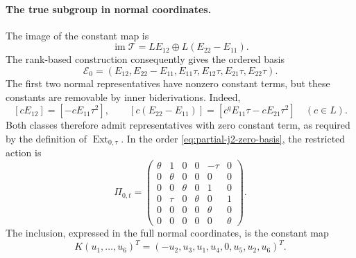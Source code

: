 \paragraph{The true subgroup in normal coordinates.}
The image of the constant map is
\[
 \operatorname{im}\mathcal T
 =L E_{12}\oplus L(E_{22}-E_{11}).
\]
The rank-based construction consequently gives the ordered basis
\begin{equation}
 \mathcal E_0=(E_{12},E_{22}-E_{11},
               E_{11}\tau,E_{12}\tau,E_{21}\tau,E_{22}\tau).
 \label{eq:partial-j2-zero-basis}
\end{equation}
The first two normal representatives have nonzero constant terms, but
these constants are removable by inner biderivations. Indeed,
\[
 [cE_{12}]=[-cE_{11}\tau^2],\qquad
 [c(E_{22}-E_{11})]=[c^qE_{11}\tau-cE_{21}\tau^2]
 \quad(c\in L).
\]
Both classes therefore admit representatives with zero constant term,
as required by the definition of $\operatorname{Ext}_{0,\tau}$.
In the order \eqref{eq:partial-j2-zero-basis}, the restricted action is
\begin{equation}
 \Pi_{0,t}=\begin{pmatrix}
  \theta&1&0&0&-\tau&0\\
  0&\theta&0&0&0&0\\
  0&0&\theta&0&1&0\\
  0&\tau&0&\theta&0&1\\
  0&0&0&0&\theta&0\\
  0&0&0&0&0&\theta
 \end{pmatrix}.
 \label{eq:partial-j2-zero-action}
\end{equation}
The inclusion, expressed in the full normal coordinates, is the constant map
\begin{equation}
 K(u_1,\ldots,u_6)^T
   =(-u_2,u_3,u_1,u_4,0,u_5,u_2,u_6)^T.
 \label{eq:partial-j2-inclusion}
\end{equation}

